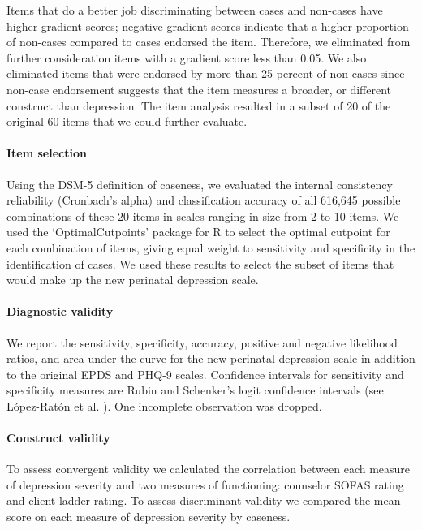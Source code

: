 \documentclass[man,natbib,longtable]{apa6}\usepackage[]{graphicx}\usepackage[]{color}
\begin{document}
Items that do a better job discriminating between cases and non-cases have higher gradient scores; negative gradient scores indicate that a higher proportion of non-cases compared to cases endorsed the item. Therefore, we eliminated from further consideration items with a gradient score less than 0.05. We also eliminated items that were endorsed by more than 25 percent of non-cases since non-case endorsement suggests that the item measures a broader, or different construct than depression.
The item analysis resulted in a subset of 20 of the original 60 items that we could further evaluate. 

\paragraph{Item selection}

Using the DSM-5 definition of caseness, we evaluated the internal consistency reliability (Cronbach's alpha) and classification accuracy of all 616,645 possible combinations of these 20 items in scales ranging in size from 2 to 10 items. We used the `OptimalCutpoints' package \citep[version 1.1-3;][]{optimalcutpoints} for R \citep[version 3.2.3;][]{RCoreTeam:2015} to select the optimal cutpoint for each combination of items, giving equal weight to sensitivity and specificity in the identification of cases. We used these results to select the subset of items that would make up the new perinatal depression scale. 

\paragraph{Diagnostic validity}

We report the sensitivity, specificity, accuracy, positive and negative likelihood ratios, and area under the curve for the new perinatal depression scale in addition to the original EPDS and PHQ-9 scales. Confidence intervals for sensitivity and specificity measures are Rubin and Schenker's logit confidence intervals (see L\'{o}pez-Rat\'{o}n et al. \citeyear{optimalcutpoints}). One incomplete observation was dropped.

\paragraph{Construct validity}

To assess convergent validity we calculated the correlation between each measure of depression severity and two measures of functioning: counselor SOFAS rating and client ladder rating. To assess discriminant validity we compared the mean score on each measure of depression severity by caseness.
\end{document}
